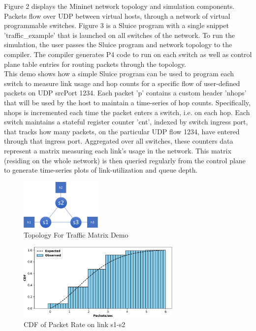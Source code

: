 \noindent Figure 2 displays the Mininet network topology and simulation components. Packets flow over UDP between virtual hosts, through a network of virtual programmable switches. Figure 3  is a Sluice program with a single snippet 'traffic\_example' that is launched on all switches of the network. To run the simulation, the user passes the Sluice program and network topology to the compiler. The compiler generates P4 code to run on each switch as well as control plane table entries for routing packets through the topology.  \\
\indent This demo shows how a simple Sluice program can be used to program each switch to measure link usage and hop counts for a specific flow of user-defined packets on UDP srcPort 1234. Each packet 'p' contains a custom header 'nhops' that will be used by the host to maintain a time-series of hop counts. Specifically, nhops is incremented each time the packet enters a switch, i.e. on each hop. Each switch maintains a stateful register counter 'cnt', indexed by switch ingress port, that tracks how many packets, on the particular UDP flow 1234, have entered through that ingress port. Aggregated over all switches, these counters data represent a matrix measuring each link's usage in the network. This matrix (residing on the whole network) is then queried regularly from the control plane to generate time-series plots of link-utilization and queue depth.  

\begin{figure}[tp]
\centering
\includegraphics[width=40mm,scale=0.7]{figures/traf_mat_topo}
\caption{Topology For Traffic Matrix Demo}
\end{figure}


\begin{figure}[tp]
\centering
\includegraphics[width=80mm,scale=0.7]{figures/exp_obs_cdf}
\caption{CDF of Packet Rate on link s1-s2}
\end{figure}
  

